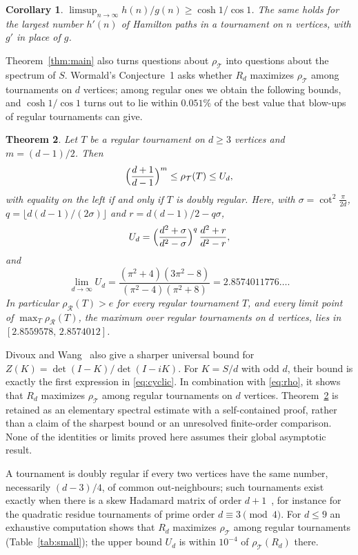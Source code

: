 \documentclass[11pt]{amsart}
\newtheorem{theorem}{Theorem}[section]
\newtheorem{corollary}[theorem]{Corollary}
\theoremstyle{remark}
\numberwithin{equation}{section}
\newcommand{\cT}{\mathcal{T}}
\newcommand{\cR}{\mathcal{R}}
\begin{document}
\begin{corollary}\label{cor:hn}
$\limsup_{n\to\infty}h(n)/g(n)\ge\cosh1/\cos1$. The same holds for the largest number $h'(n)$ of Hamilton paths in a tournament on $n$ vertices, with $g'$ in place of $g$.
\end{corollary}

Theorem~\ref{thm:main} also turns questions about $\rho_\cT$ into questions about the spectrum of $S$. Wormald's Conjecture~1 asks whether $R_d$ maximizes $\rho_\cT$ among tournaments on $d$ vertices; among regular ones we obtain the following bounds, and $\cosh1/\cos1$ turns out to lie within $0.051\%$ of the best value that blow-ups of regular tournaments can give.

\begin{theorem}\label{thm:bounds}
Let $T$ be a regular tournament on $d\ge3$ vertices and $m=(d-1)/2$. Then
\[
\Bigl(\frac{d+1}{d-1}\Bigr)^{m}\le\rho_\cT(T)\le U_d,
\]
with equality on the left if and only if $T$ is doubly regular. Here, with $\sigma=\cot^2\frac{\pi}{2d}$, $q=\lfloor d(d-1)/(2\sigma)\rfloor$ and $r=d(d-1)/2-q\sigma$,
\[
U_d=\Bigl(\frac{d^2+\sigma}{d^2-\sigma}\Bigr)^{q}\,\frac{d^2+r}{d^2-r},
\]
and
\[
\lim_{d\to\infty}U_d=\frac{(\pi^2+4)(3\pi^2-8)}{(\pi^2-4)(\pi^2+8)}=2.8574011776\ldots.
\]
In particular $\rho_\cR(T)>e$ for every regular tournament $T$, and every limit point of $\max_T\rho_\cR(T)$, the maximum over regular tournaments on $d$ vertices, lies in $[2.8559578,\,2.8574012]$.
\end{theorem}

Divoux and Wang~\cite[Proposition~7.1]{DW} also give a sharper universal bound for $Z(K)=\det(I-K)/\det(I-iK)$. For $K=S/d$ with odd $d$, their bound is exactly the first expression in \eqref{eq:cyclic}. In combination with \eqref{eq:rho}, it shows that $R_d$ maximizes $\rho_\cT$ among regular tournaments on $d$ vertices. Theorem~\ref{thm:bounds} is retained as an elementary spectral estimate with a self-contained proof, rather than a claim of the sharpest bound or an unresolved finite-order comparison. None of the identities or limits proved here assumes their global asymptotic result.

A tournament is doubly regular if every two vertices have the same number, necessarily $(d-3)/4$, of common out-neighbours; such tournaments exist exactly when there is a skew Hadamard matrix of order $d+1$~\cite{RB}, for instance for the quadratic residue tournaments of prime order $d\equiv3\pmod 4$. For $d\le9$ an exhaustive computation shows that $R_d$ maximizes $\rho_\cT$ among regular tournaments (Table~\ref{tab:small}); the upper bound $U_d$ is within $10^{-4}$ of $\rho_\cT(R_d)$ there.
\end{document}
